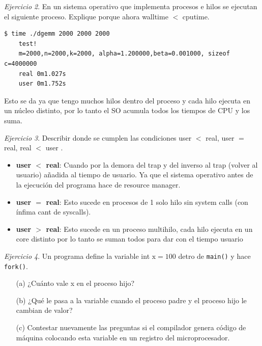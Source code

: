 \documentclass[12pt]{article}
\begin{document}
\noindent \textit{Ejercicio 2}. En un sistema operativo que implementa procesos e hilos se ejecutan el siguiente proceso. Explique porque ahora walltime $<$ cputime.

\begin{lstlisting}[style=BashStyle]
    $ time ./dgemm 2000 2000 2000
    test!
    m=2000,n=2000,k=2000, alpha=1.200000,beta=0.001000, sizeof c=4000000
    real 0m1.027s
    user 0m1.752s
\end{lstlisting}

\begin{rta}
    Esto se da ya que tengo muchos hilos dentro del proceso y cada hilo ejecuta en un núcleo distinto, por lo tanto el SO acumula todos los tiempos de CPU y los suma.
\end{rta}

\noindent \textit{Ejercicio 3}. Describir donde se cumplen las condiciones user $<$ real, user $=$ real, real $<$ user .

\begin{rta}
    \begin{itemize}
        \item \textbf{user $<$ real}: Cuando por la demora del trap y del inverso al trap (volver al usuario) añadida al tiempo de usuario. Ya que el sistema operativo antes de la ejecución del programa hace de resource manager.
        \item \textbf{user $=$ real}: Esto sucede en procesos de 1 solo hilo sin system calls (con ínfima cant de syscalls).
        \item \textbf{user $>$ real}: Esto sucede en un proceso multihilo, cada hilo ejecuta en un core distinto por lo tanto se suman todos para dar con el tiempo usuario
    \end{itemize}
\end{rta}

\noindent \textit{Ejercicio 4}. Un programa define la variable int $\mathrm{x}=100$ detro de \texttt{main()} y hace \texttt{fork()}.

\begin{itemize}
    \item[(a)] ¿Cuánto vale x en el proceso hijo?
    \item[(b)] ¿Qué le pasa a la variable cuando el proceso padre y el proceso hijo le cambian de valor?
    \item[(c)] Contestar nuevamente las preguntas si el compilador genera código de máquina colocando esta variable en un registro del microprocesador.
\end{itemize}
\end{document}
